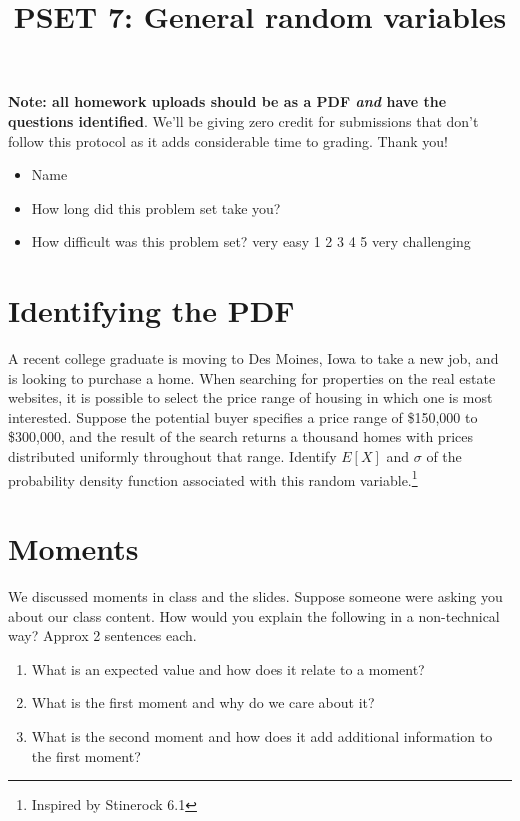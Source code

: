 \documentclass[
]{article}
\title{PSET 7: General random variables}
\author{}
\date{\vspace{-2.5em}}
\providecommand{\tightlist}{%
  \setlength{\itemsep}{0pt}\setlength{\parskip}{0pt}}
\begin{document}
\maketitle

\textbf{Note: all homework uploads should be as a PDF \emph{and} have
the questions identified}. We'll be giving zero credit for submissions
that don't follow this protocol as it adds considerable time to grading.
Thank you!

\begin{itemize}
\item
  Name
\item
  How long did this problem set take you?
\item
  How difficult was this problem set? very easy 1 2 3 4 5 very
  challenging
\end{itemize}

\section{Identifying the PDF}\label{identifying-the-pdf}

A recent college graduate is moving to Des Moines, Iowa to take a new
job, and is looking to purchase a home. When searching for properties on
the real estate websites, it is possible to select the price range of
housing in which one is most interested. Suppose the potential buyer
specifies a price range of \$150,000 to \$300,000, and the result of the
search returns a thousand homes with prices distributed uniformly
throughout that range. Identify \(E[X]\) and \(\sigma\) of the
probability density function associated with this random
variable.\footnote{Inspired by Stinerock 6.1}

\section{Moments}\label{moments}

We discussed moments in class and the slides. Suppose someone were
asking you about our class content. How would you explain the following
in a non-technical way? Approx 2 sentences each.

\begin{enumerate}
\def\labelenumi{\alph{enumi}.}
\tightlist
\item
  What is an expected value and how does it relate to a moment?
\item
  What is the first moment and why do we care about it?
\item
  What is the second moment and how does it add additional information
  to the first moment?
\end{enumerate}
\end{document}

